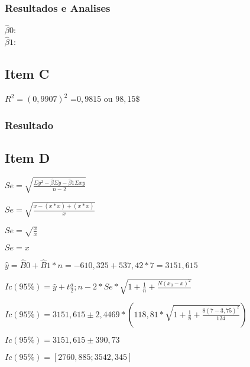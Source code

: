 \documentclass{article}
\begin{document}
            \subsubsection{Resultados e Analises}

            $\hat{\beta}0 $:  \\    
            $\hat{\beta}1 $: 

    \subsection{Item C}
        
            \begin{flushleft}
                $R^2 = (0,9907)^2$ =$0,9815$ ou $98,15\$$
            \end{flushleft}

            \subsubsection{Resultado}
            

    \subsection{Item D}
            \begin{flushleft}
            $Se = \sqrt{ \frac{\Sigma y^2 - \hat{\beta } \Sigma y - \hat{\beta}1 \Sigma xy }{n-2}}$
            \end{flushleft}   

            \begin{flushleft}
            $Se = \sqrt{ \frac{x - (x * x)+ (x * x) }{x}}$

            $Se = \sqrt{ \frac{x }{x}}$

            $Se = x$
            \end{flushleft}   

            \begin{flushleft}
            $\hat{y} = \hat{B}0 + \hat{B}1 *n = -610,325 + 537,42 * 7=3151,615$
            \end{flushleft}   

            \begin{flushleft}
            $Ic(95\%) = \hat{y} + t\frac{a}{2};n-2 *Se* \sqrt{1 + \frac{1}{n} +\frac{N(x_0 -x)^2}{}}$

            $Ic(95\%) = 3151,615 \pm 2,4469 *  (118,81* \sqrt{1 + \frac{1}{8} + \frac{8(7-3,75)^2}{124}})$

            $Ic(95\%) =  3151,615 \pm 390,73$

            $Ic(95\%) = [2760,885 ; 3542,345]$
    \end{flushleft}
\end{document}
